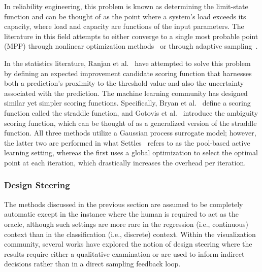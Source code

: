 In reliability engineering, this problem is known as determining the limit-state function and can be thought of as the point where a system's load exceeds its capacity, where load and capacity are functions of the input parameters.
%
The literature in this field attempts to either converge to a single most probable point (MPP) through nonlinear optimization methods~\cite{EldredBichon2006,EldredAgarwalPerez2007} or through adaptive sampling~\cite{Wu1994,DeyMahadevan1998,ZouMahadevanMourelatos2002,BichonEldredSwiler2008}.

In the statistics literature, Ranjan et al.~\cite{RanjanBinghamMichailidis2008} have attempted to solve this problem by defining an expected improvement candidate scoring function that harnesses both a prediction's proximity to the threshold value and also the uncertainty associated with the prediction.
%
The machine learning community has designed similar yet simpler scoring functions.
%
Specifically, Bryan et al.~\cite{BryanSchneiderNichol2005} define a scoring function called the straddle function, and Gotovis et al.~\cite{GotovosCasatiHitz2013} introduce the ambiguity scoring function, which can be thought of as a generalized version of the straddle function.
%
All three methods utilize a Gaussian process surrogate model; however, the latter two are performed in what Settles~\cite{Settles2009} refers to as the pool-based active learning setting, whereas the first uses a global optimization to select the optimal point at each iteration, which drastically increases the overhead per iteration.

\subsubsection{Design Steering}
\label{sec:designSteering}

The methods discussed in the previous section are assumed to be completely automatic except in the instance where the human is required to act as the oracle, although such settings are more rare in the regression (i.e., continuous) context than in the classification (i.e., discrete) context.
%
%
%
Within the visualization community, several works have explored the notion of design steering where the results require either a qualitative examination or are used to inform indirect decisions rather than in a direct sampling feedback loop.

